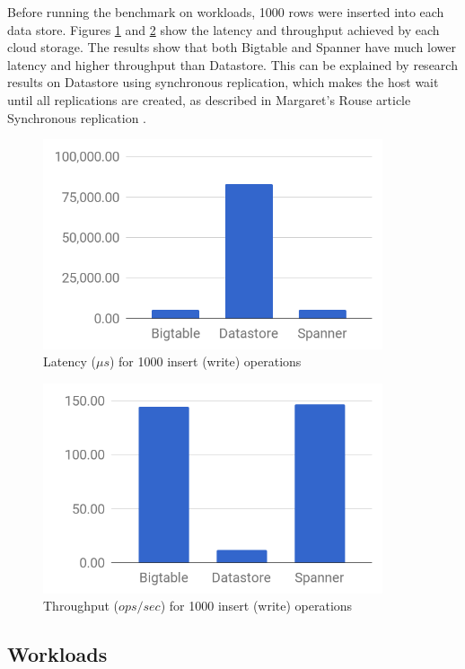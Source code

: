 \documentclass[bsc,frontabs,twoside,singlespacing,parskip,deptreport]{infthesis}     %
\begin{document}
Before running the benchmark on workloads, 1000 rows were inserted into each data store. Figures \ref{load-latency} and \ref{load-throughput} show the latency and throughput achieved by each cloud storage. The results show that both Bigtable and Spanner have much lower latency and higher throughput than Datastore. This can be explained by research results on Datastore using synchronous replication, which makes the host wait until all replications are created, as described in Margaret's Rouse article Synchronous replication \citep{synchronous-replication}.

\begin{figure}[ht]
	\centering
	\includegraphics[width=10cm]{load-latency}
	\caption{Latency (\( \mu s\)) for 1000 insert (write) operations}
	\label{load-latency}
\end{figure}
\begin{figure}[ht]
	\centering
	\includegraphics[width=10cm]{load-throughput}
	\caption{Throughput (\(ops/sec\)) for 1000 insert (write) operations}
	\label{load-throughput}
\end{figure}

\subsection{Workloads}
\end{document}

